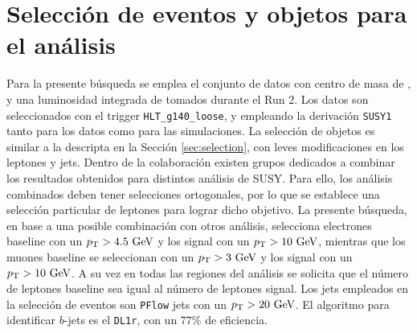 \begin{table}[h!]
  \centering
  \caption{Muestras de de producción de tops y bosones de Higgs decayendo a fotones utilizadas en el análisis con producción electrodébil, donde se especifica su generador, sección eficaz, $k$-factor y eficiencia de filtro.}
  \label{tab:higgs_bkg}
\end{table}



\section{Selección de eventos y objetos para el análisis}

Para la presente búsqueda se emplea el conjunto de datos con centro de masa de , y una luminosidad integrada de  tomados durante el Run 2. Los datos son seleccionados con el trigger \texttt{HLT\_g140\_loose}, y empleando la derivación \texttt{SUSY1} tanto para los datos como para las simulaciones. La selección de objetos es similar a la descripta en la Sección \ref{sec:selection}, con leves modificaciones en los leptones y jets. Dentro de la colaboración existen grupos dedicados a combinar los resultados obtenidos para distintos análisis de SUSY. Para ello, los análisis combinados deben tener selecciones ortogonales, por lo que se establece una selección particular de leptones para lograr dicho objetivo. La presente búsqueda, en base a una posible combinación con otros análisis, selecciona electrones baseline con un $\pt>4.5\ \gev$ y los signal con un $\pt>10 \ \gev$, mientras que los muones baseline se seleccionan con un $p_{\text{T}}>3\ \text{GeV}$ y los signal con un $\pt>10\ \gev$. A su vez en todas las regiones del análisis se solicita que el número de leptones baseline sea igual al número de leptones signal. Los jets empleados en la selección de eventos son \texttt{PFlow} jets con un $p_{\text{T}}>20\ \text{GeV}$. El algoritmo para identificar $b$-jets es el \texttt{DL1r}, con un $77\%$ de eficiencia.



